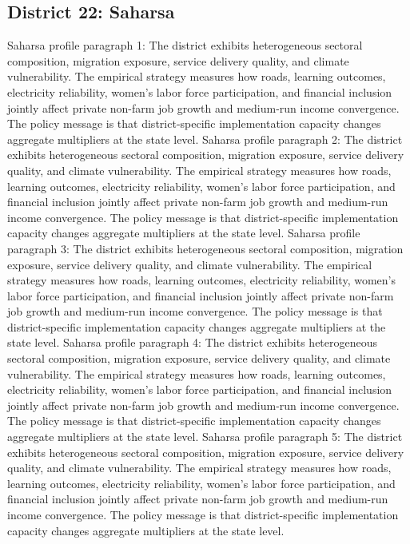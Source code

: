 \documentclass[preprint,12pt]{elsarticle}
\begin{document}
\subsection{District 22: Saharsa}
Saharsa profile paragraph 1: The district exhibits heterogeneous sectoral composition, migration exposure, service delivery quality, and climate vulnerability. The empirical strategy measures how roads, learning outcomes, electricity reliability, women's labor force participation, and financial inclusion jointly affect private non-farm job growth and medium-run income convergence. The policy message is that district-specific implementation capacity changes aggregate multipliers at the state level.
Saharsa profile paragraph 2: The district exhibits heterogeneous sectoral composition, migration exposure, service delivery quality, and climate vulnerability. The empirical strategy measures how roads, learning outcomes, electricity reliability, women's labor force participation, and financial inclusion jointly affect private non-farm job growth and medium-run income convergence. The policy message is that district-specific implementation capacity changes aggregate multipliers at the state level.
Saharsa profile paragraph 3: The district exhibits heterogeneous sectoral composition, migration exposure, service delivery quality, and climate vulnerability. The empirical strategy measures how roads, learning outcomes, electricity reliability, women's labor force participation, and financial inclusion jointly affect private non-farm job growth and medium-run income convergence. The policy message is that district-specific implementation capacity changes aggregate multipliers at the state level.
Saharsa profile paragraph 4: The district exhibits heterogeneous sectoral composition, migration exposure, service delivery quality, and climate vulnerability. The empirical strategy measures how roads, learning outcomes, electricity reliability, women's labor force participation, and financial inclusion jointly affect private non-farm job growth and medium-run income convergence. The policy message is that district-specific implementation capacity changes aggregate multipliers at the state level.
Saharsa profile paragraph 5: The district exhibits heterogeneous sectoral composition, migration exposure, service delivery quality, and climate vulnerability. The empirical strategy measures how roads, learning outcomes, electricity reliability, women's labor force participation, and financial inclusion jointly affect private non-farm job growth and medium-run income convergence. The policy message is that district-specific implementation capacity changes aggregate multipliers at the state level.
\end{document}
